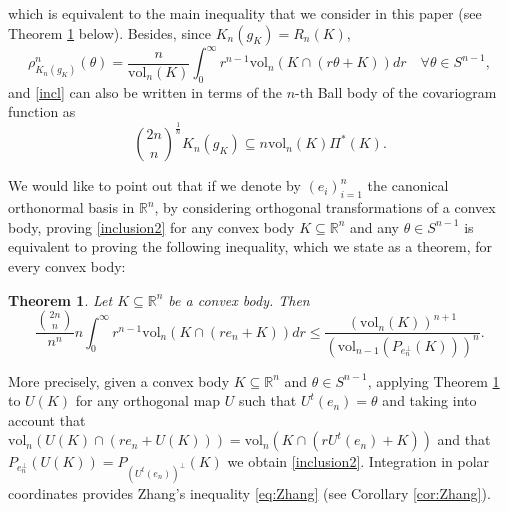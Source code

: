 \documentclass[10pt]{amsart}
\newtheorem{thm}{Theorem}[section]
\def\R{\mathbb{R}}
\def\vol{\mathrm{vol}}
\numberwithin{equation}{section}
\begin{document}
which is equivalent to the main inequality that we consider in this paper (see Theorem \ref{thm:ZhangPreIntegration} below). Besides, since $K_n(g_K)=R_n(K)$,
\begin{equation}\label{eq:RadialFunctioNthBallBodyCovariogram}
\rho_{K_n(g_K)}^n(\theta)=\frac{n}{\vol_n(K)}\int_0^\infty r^{n-1}\vol_n(K\cap(r\theta+K))dr\quad\forall\theta\in S^{n-1},
\end{equation}
and \eqref{incl} can also be written in terms of the $n$-th Ball body of the covariogram function as
\begin{equation}\label{inclusion}
{{2n}\choose{n}}^\frac{1}{n}K_n(g_K)\subseteq n\vol_n(K)\Pi^*(K).
\end{equation}



We would like to point out that if we denote by $(e_i)_{i=1}^n$ the canonical orthonormal basis in $\R^n$, by considering orthogonal transformations of a convex body, proving \eqref{inclusion2} for any convex body $K\subseteq\R^n$ and any $\theta\in S^{n-1}$ is equivalent to proving the following inequality, which we state as a theorem, for every convex body:
\begin{thm}\label{thm:ZhangPreIntegration}
Let $K\subseteq\R^n$ be a convex body. Then
$$
\frac{{{2n}\choose{n}}}{n^n}n\int_0^\infty r^{n-1}\vol_n(K\cap(re_n+K))dr\leq\frac{(\vol_n(K))^{n+1}}{(\vol_{n-1}(P_{e_n^\perp}(K)))^n}.
$$
\end{thm}
More precisely, given a convex body $K\subseteq\R^n$ and $\theta\in S^{n-1}$, applying Theorem \ref{thm:ZhangPreIntegration} to $U(K)$ for any orthogonal map $U$ such that $U^t(e_n)=\theta$ and taking into account that $\vol_n(U(K)\cap(re_n+U(K)))=\vol_n(K\cap(rU^t(e_n)+K))$ and that $P_{e_n^\perp}(U(K))=P_{(U^t(e_n))^\perp}(K)$ we obtain \eqref{inclusion2}. Integration in polar coordinates provides Zhang's inequality \eqref{eq:Zhang} (see Corollary \ref{cor:Zhang}).
\end{document}
